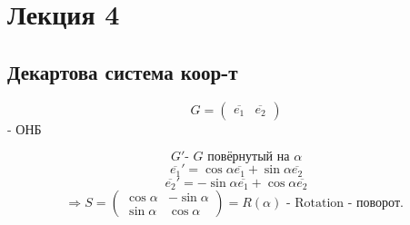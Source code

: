 \section{Лекция 4}

\subsection{Декартова система коор-т}

\[
    G = \begin{pmatrix}\overline{e_1} & \overline{e_2} \end{pmatrix}
\] - ОНБ 

\[
    G' \text{- $G$ повёрнутый на $\alpha$}
\] 
\[
    \overline{e_1}' = \cos \alpha \overline{e_1} + \sin \alpha \overline{e_2}
\] 
\[
    \overline{e_2}' = -\sin\alpha \overline{e_1} + \cos \alpha \overline{e_2}
\] 
\[
    \Rightarrow S = \begin{pmatrix}\cos \alpha & -\sin \alpha \\ \sin \alpha & \cos \alpha \end{pmatrix} = R(\alpha) \text{ - Rotation - поворот. }
\] 

